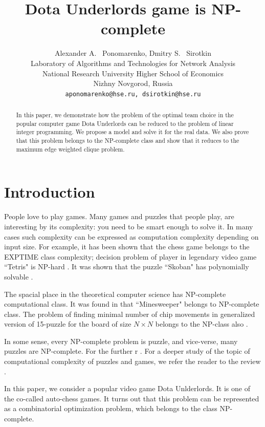 \documentclass{article}
\title{Dota Underlords game is NP-complete}
\author{
  Alexander A. ~Ponomarenko, Dmitry S. ~Sirotkin \\
  Laboratory of Algorithms and Technologies for Network Analysis\\
  National Research University Higher School of Economics \\
  Nizhny Novgorod, Russia\\
  \texttt{aponomarenko@hse.ru, dsirotkin@hse.ru} \\
}
\begin{document}
\maketitle

\begin{abstract}
In this paper, we demonstrate how the problem of the optimal team choice in the popular computer game Dota Underlords can be reduced to the problem of linear integer  programming. We propose a model and solve it for the real data. We also prove that this problem belongs to the NP-complete class and show that it reduces to the maximum edge weighted clique problem.

\end{abstract}




\section{Introduction}
People love to play games. Many games and puzzles that people play, are interesting by its complexity: you need to be smart  enough to solve it. In many cases such complexity can be expressed as computation complexity depending on input size. For example, it has been shown \cite{fraenkel1981computing} that the chess game belongs to the EXPTIME class complexity; 
decision problem of player in legendary video game ``Tetris" is NP-hard \cite{breukelaar2004tetris}. It was shown that the puzzle ``Skoban"  has polynomially solvable \cite{hearn2005pspace}.

The spacial place in the theoretical computer science has NP-complete computational class.
It was found in \cite{kaye2000minesweeper} that ``Minesweeper" belongs to NP-complete class. The problem of finding minimal number of chip movements in generalized version of 15-puzzle for the board of size $N \times N$ belongs to the NP-class also  \cite{ratner1986finding}.

In some sense, every NP-complete problem is puzzle, and vice-verse, many puzzles are NP-complete. For the further r . For a deeper study of the topic of computational complexity of puzzles and games, we refer the reader to the review \cite{costa2018computational}.

In this paper, we consider a popular video game Dota Unlderlords. It is one of the co-called  auto-chess games. It turns out that this problem can be represented as a combinatorial optimization problem, which belongs to the class NP-complete.
\end{document}
